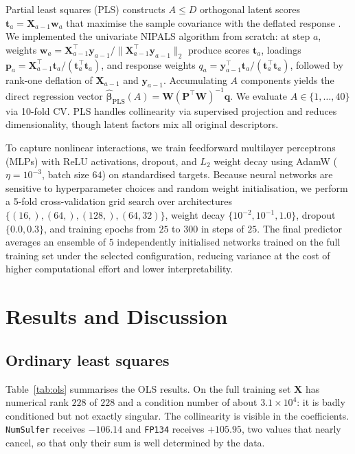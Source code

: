 \documentclass[conference]{IEEEtran}
\begin{document}
Partial least squares (PLS) constructs $A \le D$ orthogonal latent
scores $\mathbf{t}_a = \mathbf{X}_{a-1}\mathbf{w}_a$ that maximise the
sample covariance with the deflated response \cite{hastie2009}. We
implemented the univariate NIPALS algorithm from scratch: at step $a$,
weights $\mathbf{w}_a = \mathbf{X}_{a-1}^{\top}\mathbf{y}_{a-1} /
\|\mathbf{X}_{a-1}^{\top}\mathbf{y}_{a-1}\|_2$ produce scores
$\mathbf{t}_a$, loadings $\mathbf{p}_a =
\mathbf{X}_{a-1}^{\top}\mathbf{t}_a / (\mathbf{t}_a^{\top}\mathbf{t}_a)$,
and response weights $q_a = \mathbf{y}_{a-1}^{\top}\mathbf{t}_a /
(\mathbf{t}_a^{\top}\mathbf{t}_a)$, followed by rank-one deflation of
$\mathbf{X}_{a-1}$ and $\mathbf{y}_{a-1}$. Accumulating $A$ components
yields the direct regression vector $\hat{\boldsymbol{\beta}}_{\mathrm{PLS}}(A) =
\mathbf{W}(\mathbf{P}^{\top}\mathbf{W})^{-1}\mathbf{q}$. We evaluate
$A \in \{1,\dots,40\}$ via 10-fold CV. PLS handles collinearity via
supervised projection and reduces dimensionality, though latent factors
mix all original descriptors.

To capture nonlinear interactions, we train feedforward multilayer
perceptrons (MLPs) with ReLU activations, dropout, and $L_2$ weight
decay using AdamW ($\eta = 10^{-3}$, batch size $64$) on standardised
targets. Because neural networks are sensitive to hyperparameter choices
and random weight initialisation, we perform a 5-fold cross-validation
grid search over architectures $\{(16,), (64,), (128,), (64, 32)\}$,
weight decay $\{10^{-2}, 10^{-1}, 1.0\}$, dropout $\{0.0, 0.3\}$, and
training epochs from $25$ to $300$ in steps of $25$. The final predictor averages
an ensemble of $5$ independently initialised networks trained on the full
training set under the selected configuration, reducing variance at the
cost of higher computational effort and lower interpretability.

\section{Results and Discussion}
\label{sec:results}

\subsection{Ordinary least squares}
\label{subsec:res-ols}

Table~\ref{tab:ols} summarises the OLS results. On the full training
set $\mathbf{X}$ has numerical rank $228$ of $228$ and a condition
number of about $3.1 \times 10^{4}$: it is badly conditioned but not
exactly singular. The collinearity is visible in the coefficients.
\texttt{NumSulfer} receives $-106.14$ and \texttt{FP134} receives
$+105.95$, two values that nearly cancel, so that only their sum is
well determined by the data.
\end{document}
